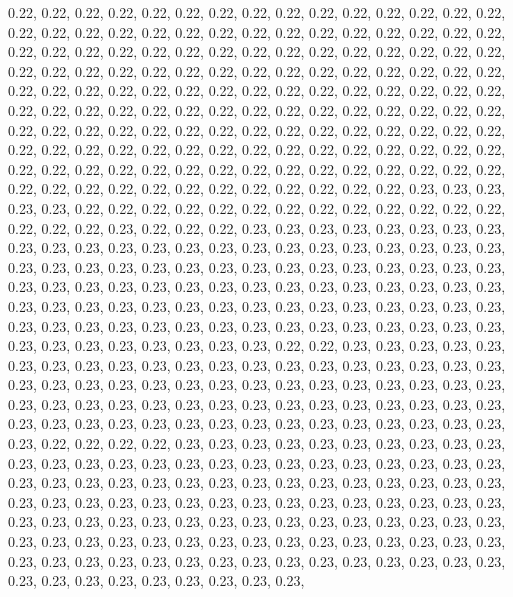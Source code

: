 \documentclass[11pt,]{article}
\begin{document}
0.22, 0.22, 0.22, 0.22, 0.22, 0.22, 0.22, 0.22, 0.22, 0.22, 0.22, 0.22,
0.22, 0.22, 0.22, 0.22, 0.22, 0.22, 0.22, 0.22, 0.22, 0.22, 0.22, 0.22,
0.22, 0.22, 0.22, 0.22, 0.22, 0.22, 0.22, 0.22, 0.22, 0.22, 0.22, 0.22,
0.22, 0.22, 0.22, 0.22, 0.22, 0.22, 0.22, 0.22, 0.22, 0.22, 0.22, 0.22,
0.22, 0.22, 0.22, 0.22, 0.22, 0.22, 0.22, 0.22, 0.22, 0.22, 0.22, 0.22,
0.22, 0.22, 0.22, 0.22, 0.22, 0.22, 0.22, 0.22, 0.22, 0.22, 0.22, 0.22,
0.22, 0.22, 0.22, 0.22, 0.22, 0.22, 0.22, 0.22, 0.22, 0.22, 0.22, 0.22,
0.22, 0.22, 0.22, 0.22, 0.22, 0.22, 0.22, 0.22, 0.22, 0.22, 0.22, 0.22,
0.22, 0.22, 0.22, 0.22, 0.22, 0.22, 0.22, 0.22, 0.22, 0.22, 0.22, 0.22,
0.22, 0.22, 0.22, 0.22, 0.22, 0.22, 0.22, 0.22, 0.22, 0.22, 0.22, 0.22,
0.22, 0.22, 0.22, 0.22, 0.22, 0.22, 0.22, 0.22, 0.22, 0.22, 0.22, 0.22,
0.22, 0.22, 0.22, 0.22, 0.22, 0.22, 0.22, 0.22, 0.22, 0.22, 0.22, 0.22,
0.22, 0.22, 0.22, 0.23, 0.23, 0.23, 0.23, 0.23, 0.22, 0.22, 0.22, 0.22,
0.22, 0.22, 0.22, 0.22, 0.22, 0.22, 0.22, 0.22, 0.22, 0.22, 0.22, 0.22,
0.23, 0.22, 0.22, 0.22, 0.23, 0.23, 0.23, 0.23, 0.23, 0.23, 0.23, 0.23,
0.23, 0.23, 0.23, 0.23, 0.23, 0.23, 0.23, 0.23, 0.23, 0.23, 0.23, 0.23,
0.23, 0.23, 0.23, 0.23, 0.23, 0.23, 0.23, 0.23, 0.23, 0.23, 0.23, 0.23,
0.23, 0.23, 0.23, 0.23, 0.23, 0.23, 0.23, 0.23, 0.23, 0.23, 0.23, 0.23,
0.23, 0.23, 0.23, 0.23, 0.23, 0.23, 0.23, 0.23, 0.23, 0.23, 0.23, 0.23,
0.23, 0.23, 0.23, 0.23, 0.23, 0.23, 0.23, 0.23, 0.23, 0.23, 0.23, 0.23,
0.23, 0.23, 0.23, 0.23, 0.23, 0.23, 0.23, 0.23, 0.23, 0.23, 0.23, 0.23,
0.23, 0.23, 0.23, 0.23, 0.23, 0.23, 0.23, 0.23, 0.23, 0.23, 0.23, 0.22,
0.22, 0.23, 0.23, 0.23, 0.23, 0.23, 0.23, 0.23, 0.23, 0.23, 0.23, 0.23,
0.23, 0.23, 0.23, 0.23, 0.23, 0.23, 0.23, 0.23, 0.23, 0.23, 0.23, 0.23,
0.23, 0.23, 0.23, 0.23, 0.23, 0.23, 0.23, 0.23, 0.23, 0.23, 0.23, 0.23,
0.23, 0.23, 0.23, 0.23, 0.23, 0.23, 0.23, 0.23, 0.23, 0.23, 0.23, 0.23,
0.23, 0.23, 0.23, 0.23, 0.23, 0.23, 0.23, 0.23, 0.23, 0.23, 0.23, 0.23,
0.23, 0.23, 0.23, 0.23, 0.23, 0.23, 0.23, 0.22, 0.22, 0.22, 0.22, 0.23,
0.23, 0.23, 0.23, 0.23, 0.23, 0.23, 0.23, 0.23, 0.23, 0.23, 0.23, 0.23,
0.23, 0.23, 0.23, 0.23, 0.23, 0.23, 0.23, 0.23, 0.23, 0.23, 0.23, 0.23,
0.23, 0.23, 0.23, 0.23, 0.23, 0.23, 0.23, 0.23, 0.23, 0.23, 0.23, 0.23,
0.23, 0.23, 0.23, 0.23, 0.23, 0.23, 0.23, 0.23, 0.23, 0.23, 0.23, 0.23,
0.23, 0.23, 0.23, 0.23, 0.23, 0.23, 0.23, 0.23, 0.23, 0.23, 0.23, 0.23,
0.23, 0.23, 0.23, 0.23, 0.23, 0.23, 0.23, 0.23, 0.23, 0.23, 0.23, 0.23,
0.23, 0.23, 0.23, 0.23, 0.23, 0.23, 0.23, 0.23, 0.23, 0.23, 0.23, 0.23,
0.23, 0.23, 0.23, 0.23, 0.23, 0.23, 0.23, 0.23, 0.23, 0.23, 0.23, 0.23,
0.23, 0.23, 0.23, 0.23, 0.23, 0.23, 0.23, 0.23, 0.23, 0.23, 0.23, 0.23,
\end{document}
